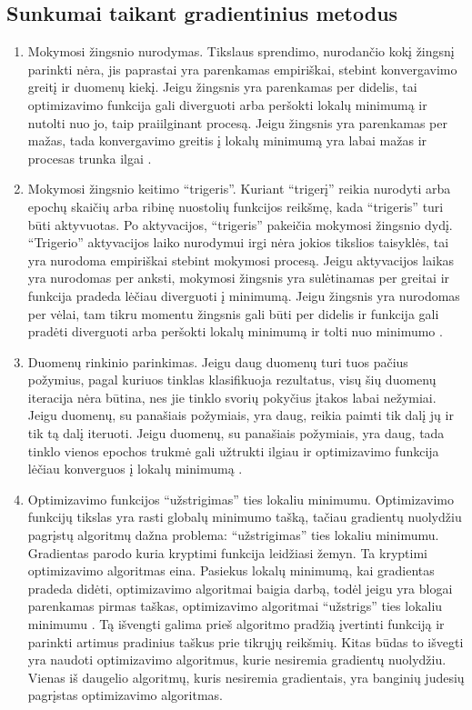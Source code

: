 \documentclass{VUMIFInfKursinis}
\begin{document}
\subsection{Sunkumai taikant gradientinius metodus}
\begin{enumerate}
\item Mokymosi žingsnio nurodymas. Tikslaus sprendimo, nurodančio kokį žingsnį parinkti nėra, jis paprastai
yra parenkamas empiriškai, stebint konvergavimo greitį ir duomenų kiekį. Jeigu žingsnis yra parenkamas per didelis,
tai optimizavimo funkcija gali diverguoti arba peršokti lokalų minimumą ir nutolti nuo jo, taip praiilginant
procesą. Jeigu žingsnis yra parenkamas per mažas, tada konvergavimo greitis į lokalų minimumą yra labai mažas
ir procesas trunka ilgai \cite{salt17}.
\item Mokymosi žingsnio keitimo \enquote{trigeris}. Kuriant \enquote{trigerį} reikia nurodyti arba epochų skaičių arba ribinę nuostolių
funkcijos reikšmę, kada \enquote{trigeris} turi būti aktyvuotas. Po aktyvacijos, \enquote{trigeris} pakeičia mokymosi žingsnio dydį.
\enquote{Trigerio} aktyvacijos laiko nurodymui irgi nėra jokios tikslios taisyklės, tai yra nurodoma empiriškai stebint
mokymosi procesą. Jeigu aktyvacijos laikas yra nurodomas per anksti, mokymosi žingsnis yra sulėtinamas per greitai
ir funkcija pradeda lėčiau diverguoti į minimumą. Jeigu žingsnis yra nurodomas per vėlai, tam tikru momentu
žingsnis gali būti per didelis ir funkcija gali pradėti diverguoti arba peršokti lokalų minimumą ir tolti nuo
minimumo \cite{salt17}.
\item Duomenų rinkinio parinkimas. Jeigu daug duomenų turi tuos pačius požymius, pagal kuriuos tinklas klasifikuoja
rezultatus, visų šių duomenų iteracija nėra būtina, nes jie tinklo svorių pokyčius įtakos labai nežymiai.
Jeigu duomenų, su panašiais požymiais, yra daug, reikia paimti tik dalį jų ir tik tą dalį iteruoti. Jeigu
duomenų, su panašiais požymiais, yra daug, tada tinklo vienos epochos trukmė gali užtrukti ilgiau ir optimizavimo
funkcija lėčiau konverguos į lokalų minimumą \cite{salt17}.
\item Optimizavimo funkcijos \enquote{užstrigimas} ties lokaliu minimumu. Optimizavimo funkcijų tikslas yra rasti
globalų minimumo tašką, tačiau gradientų nuolydžiu pagrįstų algoritmų dažna problema: \enquote{užstrigimas} ties
lokaliu minimumu. Gradientas parodo kuria kryptimi funkcija leidžiasi žemyn. Ta kryptimi optimizavimo algoritmas
eina. Pasiekus lokalų minimumą, kai gradientas pradeda didėti, optimizavimo algoritmai baigia darbą, todėl jeigu yra
blogai parenkamas pirmas taškas, optimizavimo algoritmai \enquote{užstrigs} ties lokaliu minimumu \cite{salt17}. Tą išvengti galima prieš algoritmo pradžią
įvertinti funkciją ir parinkti artimus pradinius taškus prie tikrųjų reikšmių. Kitas būdas to išvegti yra naudoti
optimizavimo algoritmus, kurie nesiremia gradientų nuolydžiu. Vienas iš daugelio algoritmų, kuris nesiremia gradientais, yra
banginių judesių pagrįstas optimizavimo algoritmas.
\end{enumerate}
\end{document}
